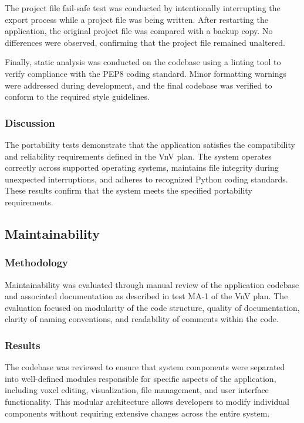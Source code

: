 \documentclass[12pt, titlepage]{article}
\begin{document}
The project file fail-safe test was conducted by intentionally interrupting the export process while a project file was being written. After restarting the application, the original project file was compared with a backup copy. No differences were observed, confirming that the project file remained unaltered.

Finally, static analysis was conducted on the codebase using a linting tool to verify compliance with the PEP8 coding standard. Minor formatting warnings were addressed during development, and the final codebase was verified to conform to the required style guidelines.

\subsubsection{Discussion}

The portability tests demonstrate that the application satisfies the compatibility and reliability requirements defined in the VnV plan. The system operates correctly across supported operating systems, maintains file integrity during unexpected interruptions, and adheres to recognized Python coding standards. These results confirm that the system meets the specified portability requirements.

\subsection{Maintainability}

\subsubsection{Methodology}

Maintainability was evaluated through manual review of the application codebase and associated documentation as described in test MA-1 of the VnV plan. The evaluation focused on modularity of the code structure, quality of documentation, clarity of naming conventions, and readability of comments within the code.

\subsubsection{Results}

The codebase was reviewed to ensure that system components were separated into well-defined modules responsible for specific aspects of the application, including voxel editing, visualization, file management, and user interface functionality. This modular architecture allows developers to modify individual components without requiring extensive changes across the entire system.
\end{document}
